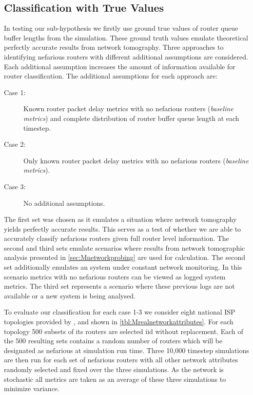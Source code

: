   \subsection{Classification with True Values}
  \label{ssec:MTruevalues}
  In testing our sub-hypothesis we firstly use ground true values of router queue buffer lengths from the simulation. These ground truth values emulate theoretical perfectly accurate results from network tomography. Three approaches to identifying nefarious routers with different additional assumptions are considered. Each additional assumption increases the amount of information available for router classification. The additional assumptions for each approach are:
  \begin{description}
      \item[Case 1:] Known router packet delay metrics with no nefarious routers (\textit{baseline metrics}) and complete distribution of router buffer queue length at each timestep.
      \item[Case 2:] Only known router packet delay metrics with no nefarious routers (\textit{baseline metrics}).
      \item[Case 3:] No additional assumptions.
  \end{description}
  The first set was chosen as it emulates a situation where network tomography yields perfectly accurate results. This serves as a test of whether we are able to accurately classify nefarious routers given full router level information. The second and third sets emulate scenarios where results from network tomographic analysis presented in \cref{sec:Mnetworkprobing} are used for calculation. The second set additionally emulates an system under constant network monitoring. In this scenario metrics with no nefarious routers can be viewed as logged system metrics. The third set represents a scenario where these previous logs are not available or a new system is being analysed.\par
  To evaluate our classification for each case 1-3 we consider eight national ISP topologies provided by \cite{orlowski_sndlib_2007}, \cite{knight_internet_2011} and shown in \cref{tbl:Mrealnetworkattributes}. For each topology 500 subsets of its routers are selected iid without replacement. Each of the 500 resulting sets contains a random number of routers which will be designated as nefarious at simulation run time. Three 10,000 timestep simulations are then run for each set of nefarious routers with all other network attributes randomly selected and fixed over the three simulations. As the network is stochastic all metrics are taken as an average of these three simulations to minimize variance.\par
